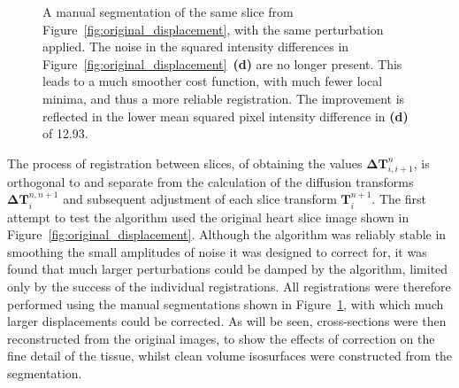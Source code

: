 \begin{figure}[htbp]
    \caption{A manual segmentation of the same slice from Figure~\ref{fig:original_displacement}, with the same perturbation applied. The noise in the squared intensity differences in Figure~\ref{fig:original_displacement}~\textbf{(d)} are no longer present. This leads to a much smoother cost function, with much fewer local minima, and thus a more reliable registration. The improvement is reflected in the lower mean squared pixel intensity difference in \textbf{(d)} of 12.93.}
    \label{fig:segmented_displacement}
  \end{figure}
  
  The process of registration between slices, of obtaining the values $\mathbf{\Delta T}_{i,i+1}^n$, is orthogonal to and separate from the calculation of the diffusion transforms $\mathbf{\Delta T}_i^{n,n+1}$ and subsequent adjustment of each slice transform $\mathbf{T}_i^{n+1}$. The first attempt to test the algorithm used the original heart slice image shown in Figure~\ref{fig:original_displacement}. Although the algorithm was reliably stable in smoothing the small amplitudes of noise it was designed to correct for, it was found that much larger perturbations could be damped by the algorithm, limited only by the success of the individual registrations. All registrations were therefore performed using the manual segmentations shown in Figure~\ref{fig:segmented_displacement}, with which much larger displacements could be corrected. As will be seen, cross-sections were then reconstructed from the original images, to show the effects of correction on the fine detail of the tissue, whilst clean volume isosurfaces were constructed from the segmentation.
  
